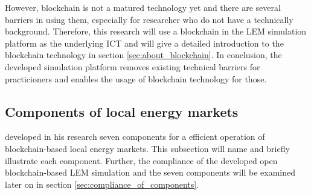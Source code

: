 However, blockchain is not a matured technology 
yet and there are several barriers in using them, especially 
for researcher who do not have a technically background. Therefore, this research 
will use a blockchain in the LEM simulation platform as the underlying ICT and will give a
detailed introduction to the blockchain technology in section \ref{sec:about_blockchain}.
In conclusion, the developed simulation platform removes existing technical barriers 
for practicioners and enables the usage of blockchain technology for those.

\subsection{Components of local energy markets}
\label{sec:components_of_local_energy_markets}
 developed in his research seven components for a efficient
operation of blockchain-based local energy markets. This subsection will name and briefly 
illustrate each component. Further, the compliance of the developed open blockchain-based
LEM simulation and the seven components will be examined later on in section \ref{sec:compliance_of_components}.


